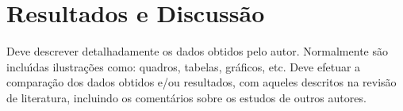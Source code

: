 
\chapter{Resultados e Discuss\~ao}\label{cap:resultadosediscussao}

Deve descrever detalhadamente os dados obtidos pelo autor. Normalmente s\~ao inclu\'{\i}das ilustra\c{c}\~oes como: quadros, tabelas, gr\'aficos, etc. Deve efetuar a compara\c{c}\~ao dos dados obtidos e/ou resultados, com aqueles descritos na revis\~ao de literatura, incluindo os coment\'arios sobre os estudos de outros autores.
